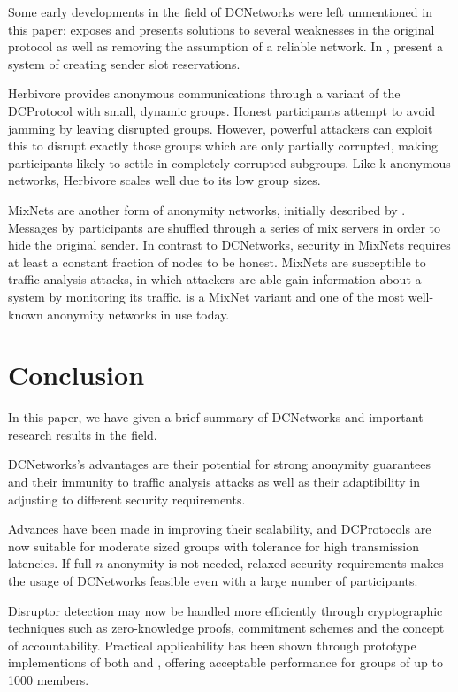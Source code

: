 Some early developments in the field of \acp{DCNetwork} were left unmentioned in this paper:
\cite{waidner1989dining} exposes and presents solutions to several weaknesses in the
original protocol as well as removing the assumption
of a reliable network. In \cite{bos1990detection}, \citeauthor{bos1990detection} present a system of creating sender slot reservations.

Herbivore \cite{goel2003herbivore} provides anonymous communications through a variant of the
\ac{DCProtocol} with small, dynamic groups. Honest participants attempt to avoid jamming by
leaving disrupted groups. However, powerful attackers can exploit this to disrupt exactly those groups
which are only partially corrupted, making participants likely to settle in completely corrupted subgroups.
Like k-anonymous networks, Herbivore scales well due to its low group sizes.

\acp{MixNet} are another form of anonymity networks, initially described by \citeauthor{journals/cacm/Chaum81}
\cite{journals/cacm/Chaum81}. Messages by participants are shuffled through a series of mix servers
in order to hide the original sender. In contrast to \acp{DCNetwork}, security in \acp{MixNet} requires
at least a constant fraction of nodes to be honest. \acp{MixNet} are susceptible to traffic analysis attacks,
in which attackers are able gain information about a system by monitoring its traffic.
\Tor \cite{conf/uss/DingledineMS04} is a \ac{MixNet} variant and one of the most well-known anonymity networks
in use today.

\section{Conclusion}

In this paper, we have given a brief summary of \acp{DCNetwork} and important
research results in the field.

\acp{DCNetwork}'s advantages are their potential for strong anonymity guarantees
and their immunity to traffic analysis attacks as well as their adaptibility in 
adjusting to different security requirements.

Advances have been made in improving their scalability, and \acp{DCProtocol} 
are now suitable for moderate sized groups with tolerance for high
transmission latencies. If full $n$-anonymity is not needed, relaxed
security requirements makes the usage of \acp{DCNetwork} feasible even with
a large number of participants.

Disruptor detection may now be handled more efficiently through cryptographic techniques
such as zero-knowledge proofs, commitment schemes and the concept of accountability.
Practical applicability
has been shown through prototype implementions of both \Verdict and \Dissent, offering
acceptable performance for groups of up to 1000 members.

